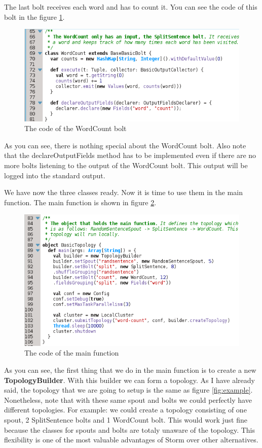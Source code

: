 The last bolt receives each word and has to count it. You can see the code of
this bolt in the figure \ref{fig:wordcount}.

\begin{figure}
  \centering
  \includegraphics[scale=0.8]{images/wordcount.png}
  \caption{The code of the WordCount bolt}\label{fig:wordcount}
\end{figure}

As you can see, there is nothing special about the WordCount bolt. Also note
that the declareOutputFields method has to be implemented even if there are no
more bolts listening to the output of the WordCount bolt. This output will be
logged into the standard output.

We have now the three classes ready. Now it is time to use them in the main
function. The main function is shown in figure \ref{fig:example_main}.

\begin{figure}
  \centering
  \includegraphics[scale=0.8]{images/main.png}
  \caption{The code of the main function}\label{fig:example_main}
\end{figure}

As you can see, the first thing that we do in the main function is to create a
new {\bf TopologyBuilder}. With this builder we can form a topology. As I have
already said, the topology that we are going to setup is the same as figure
\ref{fig:example}. Nonetheless, note that with these same spout and bolts we
could perfectly have different topologies. For example: we could create a
topology consisting of one spout, 2 SplitSentence bolts and 1 WordCount bolt.
This would work just fine because the classes for spouts and bolts are totaly
unaware of the topology. This flexibility is one of the most valuable
advantages of Storm over other alternatives.

